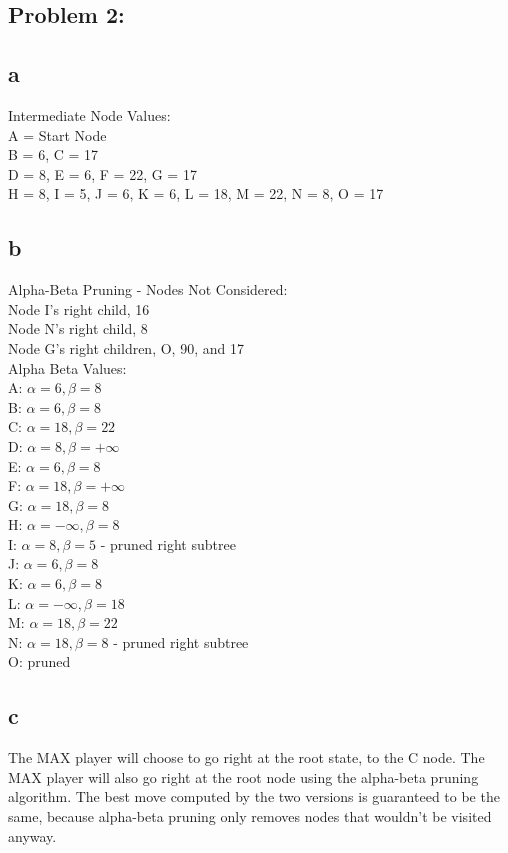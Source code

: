 \documentclass[11pt, oneside]{article}   	%
\begin{document}
\begin{flushleft}
\section*{Problem 2:}
\subsection*{a}
Intermediate Node Values:\\
A = Start Node \\
B = 6, C = 17 \\
D = 8, E = 6, F = 22, G = 17 \\
H = 8, I = 5, J = 6, K = 6, L = 18, M = 22, N = 8, O = 17 \\\medskip

\subsection*{b}
Alpha-Beta Pruning - Nodes Not Considered:\\
Node I's right child, 16\\
Node N's right child, 8\\
Node G's right children, O, 90, and 17\\\medskip
Alpha Beta Values:\\
A: $\alpha = 6, \beta = 8$\\
B: $\alpha = 6, \beta = 8$ \\
C: $\alpha = 18, \beta = 22$ \\
D: $\alpha = 8, \beta = +\infty$ \\
E: $\alpha = 6, \beta = 8$ \\
F: $\alpha = 18, \beta = +\infty$ \\
G: $\alpha = 18, \beta = 8$ \\
H: $\alpha = -\infty, \beta = 8$ \\
I: $\alpha = 8, \beta = 5$ - pruned right subtree\\
J: $\alpha = 6, \beta = 8$ \\
K: $\alpha = 6, \beta = 8$ \\
L: $\alpha = -\infty, \beta = 18$ \\
M: $\alpha = 18, \beta = 22$ \\
N: $\alpha = 18, \beta = 8$ - pruned right subtree\\
O: pruned \\\medskip

\subsection*{c}
The MAX player will choose to go right at the root state, to the C node. The MAX player will also go right at the root node using the alpha-beta pruning algorithm. The best move computed by the two versions is guaranteed to be the same, because alpha-beta pruning only removes nodes that wouldn't be visited anyway.\\\medskip


\end{flushleft}
\end{document}

